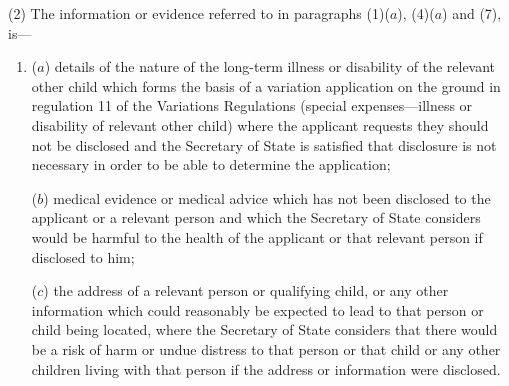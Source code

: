 \documentclass[12pt,a4paper]{article}
\begin{document}
(2) The information or evidence referred to in paragraphs (1)($a$), (4)($a$)  and (7), is—
\begin{enumerate}\item[]
($a$) details of the nature of the long-term illness or disability of the relevant other child which forms the basis of a variation application on the ground in regulation 11 of the Variations Regulations (special expenses—illness or disability of relevant other child) where the applicant requests they should not be disclosed and the 
Secretary of State  %
is satisfied that disclosure is not necessary in order to be able to determine the application;

($b$) medical evidence or medical advice which has not been disclosed to the applicant or a relevant person and which the 
Secretary of State  %
considers would be harmful to the health of the applicant or that relevant person if disclosed to him;

($c$) the address of a relevant person or qualifying child, or any other information which could reasonably be expected to lead to that person or child being located, where the 
Secretary of State  %
considers that there would be a risk of harm or undue distress to that person or that child or any other children living with that person if the address or information were disclosed.
\end{enumerate}
\end{document}
